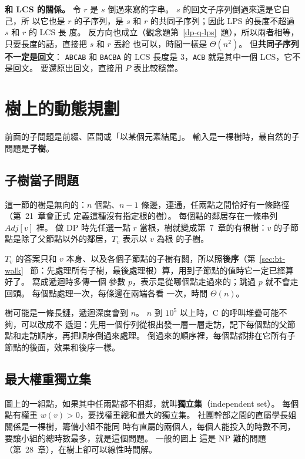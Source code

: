 \textbf{和 LCS 的關係。} 令 $r$ 是 $s$ 倒過來寫的字串。 $s$ 的回文子序列倒過來還是它自己，所
以它也是 $r$ 的子序列，是 $s$ 和 $r$ 的共同子序列；因此 LPS 的長度不超過 $s$ 和 $r$ 的 LCS 長
度。 反方向也成立（觀念題第~\ref{dp-q-lps}~題），所以兩者相等，只要長度的話，直接把 $s$ 和 $r$
丟給  也可以，時間一樣是 $\Theta(n^2)$。 但\textbf{共同子序列不一定是回文}：
\texttt{ABCAB} 和 \texttt{BACBA} 的 LCS 長度是 $3$，\texttt{ACB} 就是其中一個 LCS，它不是回文。
要還原出回文，直接用 $P$ 表比較穩當。

\section{樹上的動態規劃}
\label{sec:dp-tree}

前面的子問題是前綴、區間或「以某個元素結尾」。 輸入是一棵樹時，最自然的子問題是\textbf{子樹}。

\subsection{子樹當子問題}
\label{sec:dp-tree-sub}

這一節的樹是無向的：$n$ 個點、$n - 1$ 條邊，連通，任兩點之間恰好有一條路徑（第~21~章會正式
定義這種沒有指定根的樹）。 每個點的鄰居存在一條串列 $\mathit{Adj}[v]$ 裡。 做 DP 時先任選一點
$r$ 當根，樹就變成第~7~章的有根樹：$v$ 的子節點是除了父節點以外的鄰居，$T_v$ 表示以 $v$ 為根
的子樹。

$T_v$ 的答案只和 $v$ 本身、以及各個子節點的子樹有關，所以照\textbf{後序}（第~\ref{sec:bt-walk}~
節：先處理所有子樹，最後處理根）算，用到子節點的值時它一定已經算好了。 寫成遞迴時多傳一個
參數 $p$，表示是從哪個點走過來的；跳過 $p$ 就不會走回頭。 每個點處理一次，每條邊在兩端各看
一次，時間 $\Theta(n)$。

樹可能是一條長鏈，遞迴深度會到 $n$。 $n$ 到 $10^5$ 以上時，C 的呼叫堆疊可能不夠，可以改成不
遞迴：先用一個佇列從根出發一層一層走訪，記下每個點的父節點和走訪順序，再把順序倒過來處理。
倒過來的順序裡，每個點都排在它所有子節點的後面，效果和後序一樣。

\subsection{最大權重獨立集}
\label{sec:dp-tree-mis}

圖上的一組點，如果其中任兩點都不相鄰，就叫\textbf{獨立集}（independent set）。 每個點有權重
$w(v) > 0$，要找權重總和最大的獨立集。 社團幹部之間的直屬學長姐關係是一棵樹，籌備小組不能同
時有直屬的兩個人，每個人能投入的時數不同，要讓小組的總時數最多，就是這個問題。 一般的圖上
這是 NP 難的問題（第~28~章），在樹上卻可以線性時間解。

